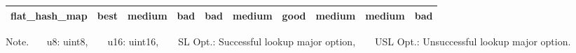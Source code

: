 \begin{table}[hbtp]
\begin{center}
\begin{tabular}{c|c|ccc|ccc|c|c}
        flat\_hash\_map                         & \cellcolor{gray100}best & \cellcolor{gray070}medium & \cellcolor{gray050}bad    & \cellcolor{gray050}bad  & \cellcolor{gray070}medium & \cellcolor{gray090}good   & \cellcolor{gray070}medium & \cellcolor{gray070}medium & \cellcolor{gray050}bad  \rule[0pt]{0pt}{15pt} \\ \hline
    \end{tabular}
    Note. \ \ \ u8: uint8,\ \ \ \ u16: uint16,\ \ \ \ SL Opt.: Successful lookup major option,\ \ \ \ USL Opt.: Unsuccessful lookup major option.
    \label{table_hashT_cmp}
  \end{center}
\end{table}







